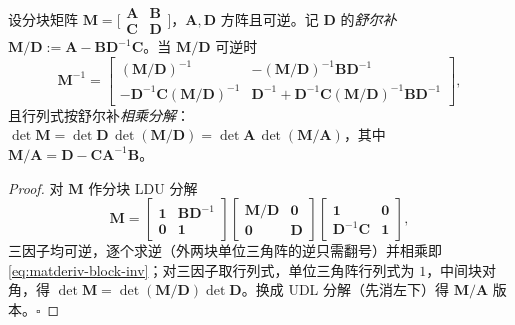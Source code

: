 \begin{proposition}[分块求逆与舒尔补]\label{prop:matderiv-block-inv}
设分块矩阵 $\mathbf{M}=\big[\begin{smallmatrix}\mathbf{A}&\mathbf{B}\\\mathbf{C}&\mathbf{D}\end{smallmatrix}\big]$，$\mathbf{A},\mathbf{D}$ 方阵且可逆。记 $\mathbf{D}$ 的\emph{舒尔补} $\mathbf{M}/\mathbf{D}:=\mathbf{A}-\mathbf{B}\mathbf{D}^{-1}\mathbf{C}$。当 $\mathbf{M}/\mathbf{D}$ 可逆时\cite{petersen2012cookbook,barfoot2024state}
\begin{equation}
  \mathbf{M}^{-1}=
  \begin{bmatrix}
    (\mathbf{M}/\mathbf{D})^{-1} & -(\mathbf{M}/\mathbf{D})^{-1}\mathbf{B}\mathbf{D}^{-1}\\
    -\mathbf{D}^{-1}\mathbf{C}(\mathbf{M}/\mathbf{D})^{-1} & \mathbf{D}^{-1}+\mathbf{D}^{-1}\mathbf{C}(\mathbf{M}/\mathbf{D})^{-1}\mathbf{B}\mathbf{D}^{-1}
  \end{bmatrix},
  \label{eq:matderiv-block-inv}
\end{equation}
且行列式按舒尔补\emph{相乘分解}：$\det\mathbf{M}=\det\mathbf{D}\,\det(\mathbf{M}/\mathbf{D})=\det\mathbf{A}\,\det(\mathbf{M}/\mathbf{A})$，其中 $\mathbf{M}/\mathbf{A}=\mathbf{D}-\mathbf{C}\mathbf{A}^{-1}\mathbf{B}$。
\end{proposition}
\begin{proof}
对 $\mathbf{M}$ 作分块 LDU 分解
\begin{equation*}
  \mathbf{M}=\begin{bmatrix}\mathbf{1}&\mathbf{B}\mathbf{D}^{-1}\\\mathbf{0}&\mathbf{1}\end{bmatrix}
  \begin{bmatrix}\mathbf{M}/\mathbf{D}&\mathbf{0}\\\mathbf{0}&\mathbf{D}\end{bmatrix}
  \begin{bmatrix}\mathbf{1}&\mathbf{0}\\\mathbf{D}^{-1}\mathbf{C}&\mathbf{1}\end{bmatrix},
\end{equation*}
三因子均可逆，逐个求逆（外两块单位三角阵的逆只需翻号）并相乘即 \cref{eq:matderiv-block-inv}；对三因子取行列式，单位三角阵行列式为 $1$，中间块对角，得 $\det\mathbf{M}=\det(\mathbf{M}/\mathbf{D})\det\mathbf{D}$。换成 UDL 分解（先消左下）得 $\mathbf{M}/\mathbf{A}$ 版本。\hfill$\square$
\end{proof}

